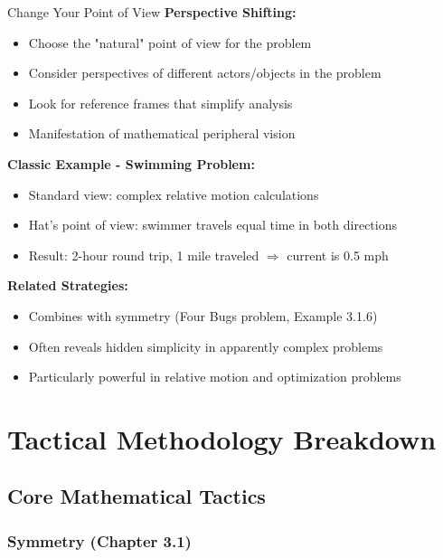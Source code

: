 \documentclass[12pt]{article}
\begin{document}
\begin{strategybox}{Change Your Point of View}
	\textbf{Perspective Shifting:}
	\begin{itemize}
		\item Choose the "natural" point of view for the problem
		\item Consider perspectives of different actors/objects in the problem
		\item Look for reference frames that simplify analysis
		\item Manifestation of mathematical peripheral vision
	\end{itemize}
	
	\textbf{Classic Example - Swimming Problem:}
	\begin{itemize}
		\item Standard view: complex relative motion calculations
		\item Hat's point of view: swimmer travels equal time in both directions
		\item Result: 2-hour round trip, 1 mile traveled $\Rightarrow$ current is 0.5 mph
	\end{itemize}
	
	\textbf{Related Strategies:}
	\begin{itemize}
		\item Combines with symmetry (Four Bugs problem, Example 3.1.6)
		\item Often reveals hidden simplicity in apparently complex problems
		\item Particularly powerful in relative motion and optimization problems
	\end{itemize}
   \end{strategybox}
	
	\section{Tactical Methodology Breakdown}
	
	\subsection{Core Mathematical Tactics}
	
	\subsubsection{Symmetry (Chapter 3.1)}
	
\end{document}
